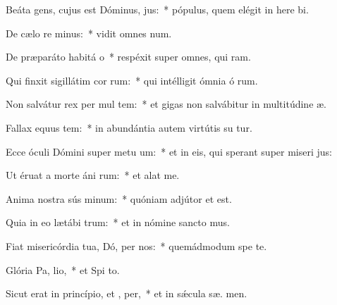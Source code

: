 \item Beáta gens, cujus est Dóminus,  jus:~* pópulus, quem elégit in here bi.
\item De cælo re minus:~* vidit omnes  num.
\item De præparáto habitá o~* respéxit super omnes, qui  ram.
\item Qui finxit sigillátim cor rum:~* qui intélligit ómnia ó rum.
\item Non salvátur rex per mul tem:~* et gigas non salvábitur in multitúdine  æ.
\item Fallax equus  tem:~* in abundántia autem virtútis su  tur.
\item Ecce óculi Dómini super metu um:~* et in eis, qui sperant super miseri jus:
\item Ut éruat a morte áni rum:~* et alat   me.
\item Anima nostra sús minum:~* quóniam adjútor et   est.
\item Quia in eo lætábi  trum:~* et in nómine sancto  mus.
\item Fiat misericórdia tua, Dó, per nos:~* quemádmodum spe  te.
\item Glória Pa,  lio,~* et Spi to.
\item Sicut erat in princípio, et ,  per,~* et in sǽcula sæ. men.
